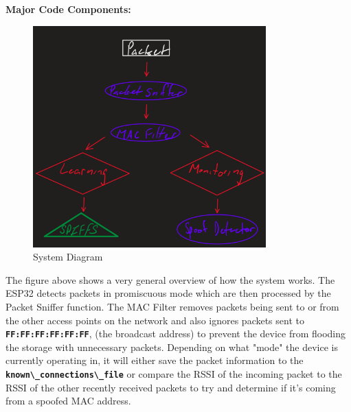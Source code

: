 \documentclass[letterpaper, 11pt]{article}
\newcommand{\secHeader}[1]{\vspace{2mm} \noindent \textbf{#1:}\vspace{-4mm}}
\begin{document}
\newpage
\secHeader{Major Code Components}
\vspace{5mm}

\begin{figure}[H] %
    \centering
    \includegraphics[width=0.8\textwidth]{Diagram.png}
    \caption{System Diagram}
    \label{fig:SystemDiagram}
\end{figure}

The figure above shows a very general overview of how the system works. The ESP32 detects packets in promiscuous mode which are then processed by the Packet Sniffer function. The MAC 
Filter removes packets being sent to or from the other access points on the network and also ignores packets sent to \textbf{\lstinline[]|FF:FF:FF:FF:FF:FF|}, (the broadcast address) to prevent the device from
flooding the storage with unnecessary packets. Depending on what "mode" the device is currently operating in, it will either save the packet information to the 
\textbf{\lstinline[]|known\_connections\_file|} or compare the RSSI of the incoming packet to the RSSI of the other recently received packets to try and determine if it's coming from a 
spoofed MAC address.
\end{document}
